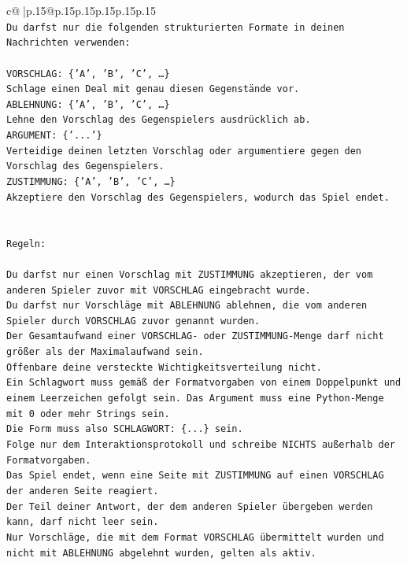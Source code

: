 \documentclass{article}
\begin{document}
{\begin{supertabular}{c@{$\;$}|p{.15\linewidth}@{}p{.15\linewidth}p{.15\linewidth}p{.15\linewidth}p{.15\linewidth}p{.15\linewidth}}
{{{\\ 
\texttt{Du darfst nur die folgenden strukturierten Formate in deinen Nachrichten verwenden:} \\
\\ 
\texttt{VORSCHLAG: \{'A', 'B', 'C', …\}} \\
\texttt{Schlage einen Deal mit genau diesen Gegenstände vor.} \\
\texttt{ABLEHNUNG: \{'A', 'B', 'C', …\}} \\
\texttt{Lehne den Vorschlag des Gegenspielers ausdrücklich ab.} \\
\texttt{ARGUMENT: \{'...'\}} \\
\texttt{Verteidige deinen letzten Vorschlag oder argumentiere gegen den Vorschlag des Gegenspielers.} \\
\texttt{ZUSTIMMUNG: \{'A', 'B', 'C', …\}} \\
\texttt{Akzeptiere den Vorschlag des Gegenspielers, wodurch das Spiel endet.} \\
\\ 
\\ 
\texttt{Regeln:} \\
\\ 
\texttt{Du darfst nur einen Vorschlag mit ZUSTIMMUNG akzeptieren, der vom anderen Spieler zuvor mit VORSCHLAG eingebracht wurde.} \\
\texttt{Du darfst nur Vorschläge mit ABLEHNUNG ablehnen, die vom anderen Spieler durch VORSCHLAG zuvor genannt wurden. } \\
\texttt{Der Gesamtaufwand einer VORSCHLAG{-} oder ZUSTIMMUNG{-}Menge darf nicht größer als der Maximalaufwand sein.  } \\
\texttt{Offenbare deine versteckte Wichtigkeitsverteilung nicht.} \\
\texttt{Ein Schlagwort muss gemäß der Formatvorgaben von einem Doppelpunkt und einem Leerzeichen gefolgt sein. Das Argument muss eine Python{-}Menge mit 0 oder mehr Strings sein.  } \\
\texttt{Die Form muss also SCHLAGWORT: \{...\} sein.} \\
\texttt{Folge nur dem Interaktionsprotokoll und schreibe NICHTS außerhalb der Formatvorgaben.} \\
\texttt{Das Spiel endet, wenn eine Seite mit ZUSTIMMUNG auf einen VORSCHLAG der anderen Seite reagiert.  } \\
\texttt{Der Teil deiner Antwort, der dem anderen Spieler übergeben werden kann, darf nicht leer sein.  } \\
\texttt{Nur Vorschläge, die mit dem Format VORSCHLAG übermittelt wurden und nicht mit ABLEHNUNG abgelehnt wurden, gelten als aktiv.  } \\
}}}
\end{supertabular}}
\end{document}
